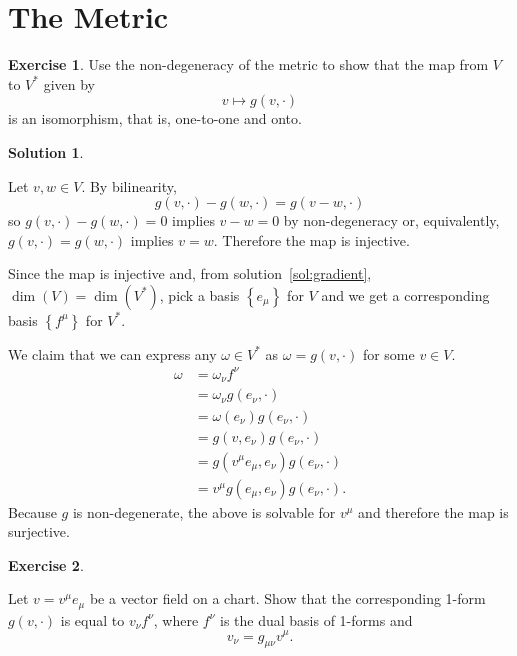 \documentclass[11pt, a4paper]{report}
\theoremstyle{definition}
\newtheorem{exercise}{Exercise}[part]
\newtheorem{solution}{Solution}[part]
\newenvironment{ex}{\begin{exercise}}{\end{exercise}\pagebreak[1]}
\newenvironment{sol}{\begin{solution}}{\end{solution}\pagebreak[3]}
\begin{document}
\section{The Metric}

\begin{ex}

Use the non-degeneracy of the metric to show that the map from $V$ to $V^*$ given by
\[
    v \mapsto g(v, \cdot)
\]
is an isomorphism, that is, one-to-one and onto.

\end{ex}

\begin{sol}\label{sol:metricisomorphism}

Let $v, w \in V$. By bilinearity,
\[
    g(v,\cdot) - g(w,\cdot) = g(v - w, \cdot)
\]
so $g(v,\cdot) - g(w,\cdot) = 0$ implies $v - w = 0$ by non-degeneracy or, equivalently, $g(v,\cdot) = g(w,\cdot)$ implies $v = w$. Therefore the map is injective.

Since the map is injective and, from solution~\ref{sol:gradient}, $\dim(V) = \dim(V^*)$, pick a basis $\left\{e_\mu\right\}$ for $V$ and we get a corresponding basis $\left\{f^\mu\right\}$ for $V^*$.

We claim that we can express any $\omega \in V^*$ as $\omega = g(v,\cdot)$ for some $v \in V$.
\begin{align*}
    \omega &= \omega_\nu f^\nu \\
           &= \omega_\nu g(e_\nu, \cdot) \\
           &= \omega(e_\nu) g(e_\nu, \cdot) \\
           &= g(v, e_\nu) g(e_\nu, \cdot) \\
           &= g(v^\mu e_\mu, e_\nu) g(e_\nu, \cdot) \\
           &= v^\mu g(e_\mu, e_\nu) g(e_\nu, \cdot).
\end{align*}
Because $g$ is non-degenerate, the above is solvable for $v^\mu$ and therefore the map is surjective.

\end{sol}

\begin{ex}\label{ex:loweringindex}

Let $v = v^\mu e_\mu$ be a vector field on a chart. Show that the corresponding 1-form $g(v, \cdot)$ is equal to $v_\nu f^\nu$, where $f^\nu$ is the dual basis of 1-forms and
\[
    v_\nu = g_{\mu\nu}v^\mu.
\]

\end{ex}
\end{document}
